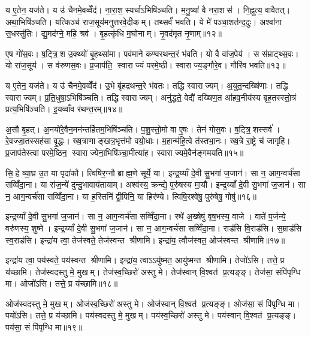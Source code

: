 य ए॒तेन॒ यज॑ते। य उ॑ चैनमे॒वव्वेँद॑। ना॒रा॒श॒स्यर्चाऽभिषि॑ञ्चति। म॒नु॒ष्या॑ वै नरा॒शस॑। नि॒ह्नुत्य॒ वावैतत्। अथा॒भिषि॑ञ्चति। यत्किञ्च॑ राज॒सूय॑मनुत्तरवे॒दीकम्। तथ्सर्वं॑ भवति। ये मे॑ पञ्चा॒शत॑न्द॒दुः। अश्वा॑ना स॒धस्तु॑तिः। द्यु॒मद॑ग्ने॒ महि॒ श्रव॑। बृ॒हत्कृ॑धि म॒घोनाम्। नृ॒वद॑मृत नृ॒णाम्॥१२॥\anuvakamend[सू॒य॒ते॒ स॒धस्तु॑ति॒स्त्रीणि॑ च]

ए॒ष गो॑स॒वः। ष॒ट्त्रि॒श उ॒क्थ्यो॑ बृ॒हथ्सा॑मा। पव॑माने कण्वरथन्त॒रं भ॑वति। यो वै वा॑ज॒पेय॑। स स॑म्राट्थ्स॒वः। यो रा॑ज॒सूय॑। स व॑रुणस॒वः। प्र॒जाप॑ति॒ स्वाराज्यं परमे॒ष्ठी। स्वाराज्य॒ङ्गौरे॒व। गौरि॑व भवति॥१३॥

य ए॒तेन॒ यज॑ते। य उ॑ चैनमे॒वव्वेँद॑। उ॒भे बृ॑हद्रथन्त॒रे भ॑वतः। तद्धि स्वाराज्यम्। अ॒युत॒न्दख्षि॑णाः। तद्धि स्वाराज्यम्। प्र॒ति॒धुषा॒ऽभिषि॑ञ्चति। तद्धि स्वाराज्यम्। अनु॑द्धते॒ वेद्यै॑ दख्षिण॒त आ॑हव॒नीय॑स्य बृह॒तस्स्तो॒त्रं प्रत्य॒भिषि॑ञ्चति। इ॒यव्वाँव र॑थन्त॒रम्॥१४॥

अ॒सौ बृ॒हत्। अ॒नयो॑रे॒वैन॒मन॑न्तर्\mbox{}हितम॒भिषि॑ञ्चति। प॒शु॒स्तो॒मो वा ए॒षः। तेन॑ गोस॒वः। ष॒ट्त्रि॒शस्सर्व॑। रे॒वज्जा॒तस्सह॑सा वृ॒द्धः। ख्ष॒त्राणाङ्खत्र॒भृत्त॑मो वयो॒धाः। म॒हान्म॑हि॒त्वे त॑स्तभा॒नः। ख्ष॒त्रे रा॒ष्ट्रे च॑ जागृहि। प्र॒जाप॑तेस्त्वा परमे॒ष्ठिन॒ स्वाराज्येना॒भिषि॑ञ्चा॒मीत्या॑ह। स्वाराज्यमे॒वैन॑ङ्गमयति॥१५॥\anuvakamend[इ॒व॒ भ॒व॒ति॒ र॒थ॒न्त॒रमा॒हैक॑ञ्च]

सि॒हे व्या॒घ्र उ॒त या पृदा॑कौ। त्विषि॑र॒ग्नौ ब्राह्म॒णे सूर्ये॒ या। इन्द्र॒य्याँ दे॒वी सु॒भगा॑ ज॒जान॑। सा न॒ आग॒न्वर्च॑सा सव्विँदा॒ना। या रा॑ज॒न्ये॑ दुन्दु॒भावाय॑तायाम्। अश्व॑स्य॒ क्रन्द्ये॒ पुरु॑षस्य मा॒यौ। इन्द्र॒य्याँ दे॒वी सु॒भगा॑ ज॒जान॑। सा न॒ आग॒न्वर्च॑सा सव्विँदा॒ना। या ह॒स्तिनि॑ द्वी॒पिनि॒ या हिर॑ण्ये। त्विषि॒रश्वे॑षु॒ पुरु॑षेषु॒ गोषु॑॥१६॥

इन्द्र॒य्याँ दे॒वी सु॒भगा॑ ज॒जान॑। सा न॒ आग॒न्वर्च॑सा सव्विँदा॒ना। रथे॑ अ॒ख्षेषु॑ वृष॒भस्य॒ वाजे। वाते॑ प॒र्जन्ये॒ वरु॑णस्य॒ शुष्मे। इन्द्र॒य्याँ दे॒वी सु॒भगा॑ ज॒जान॑। सा न॒ आग॒न्वर्च॑सा सव्विँदा॒ना। राड॑सि वि॒राड॑सि। स॒म्राड॑सि स्व॒राड॑सि। इन्द्रा॑य त्वा॒ तेज॑स्वते॒ तेज॑स्वन्त श्रीणामि। इन्द्रा॑य॒ त्वौज॑स्वत॒ ओज॑स्वन्त श्रीणामि॥१७॥

इन्द्रा॑य त्वा॒ पय॑स्वते॒ पय॑स्वन्त श्रीणामि। इन्द्रा॑य॒ त्वाऽऽयु॑ष्मत॒ आयु॑ष्मन्त श्रीणामि। तेजो॑ऽसि। तत्ते॒ प्र य॑च्छामि। तेज॑स्वदस्तु मे॒ मुखम्। तेज॑स्व॒च्छिरो॑ अस्तु मे। तेज॑स्वान् वि॒श्वत॑ प्र॒त्यङ्ङ्। तेज॑सा॒ संपि॑पृग्धि मा। ओजो॑ऽसि। तत्ते॒ प्र य॑च्छामि॥१८॥

ओज॑स्वदस्तु मे॒ मुखम्। ओज॑स्व॒च्छिरो॑ अस्तु मे। ओज॑स्वान् वि॒श्वत॑ प्र॒त्यङ्ङ्। ओज॑सा॒ सं पि॑पृग्धि मा। पयो॑ऽसि। तत्ते॒ प्र य॑च्छामि। पय॑स्वदस्तु मे॒ मुखम्। पय॑स्व॒च्छिरो॑ अस्तु मे। पय॑स्वान् वि॒श्वत॑ प्र॒त्यङ्ङ्। पय॑सा॒ सं पि॑पृग्धि मा॥१९॥

